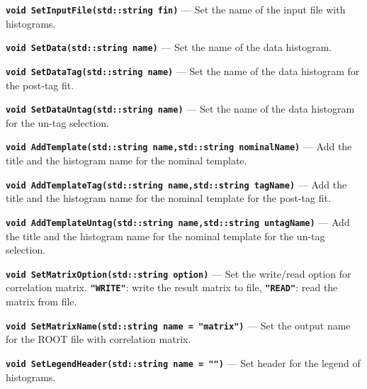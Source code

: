\documentclass[12pt]{article}
\newcommand\verbbf[1]{\textcolor[rgb]{0,0,1}{\texttt{\textbf{#1}}}}
\begin{document}
\noindent \verbbf{void SetInputFile(std::string fin)} --- Set the name
of the input file with histograms.

\vspace{0.3cm}

\noindent \verbbf{void SetData(std::string name)} --- Set the name of
the data histogram.

\vspace{0.3cm}

\noindent \verbbf{void SetDataTag(std::string name)} --- Set the name of
the data histogram for the post-tag fit.

\vspace{0.3cm}

\noindent \verbbf{void SetDataUntag(std::string name)} --- Set the name
of the data histogram for the un-tag selection.

\vspace{0.3cm}

\noindent \verbbf{void AddTemplate(std::string name,std::string nominalName)} ---
Add the title and the histogram name for the nominal template.

\vspace{0.3cm}

\noindent \verbbf{void AddTemplateTag(std::string name,std::string tagName)} ---
Add the title and the histogram name for the nominal template for the
post-tag fit.

\vspace{0.3cm}

\noindent \verbbf{void AddTemplateUntag(std::string name,std::string untagName)} ---
Add the title and the histogram name for the nominal template for the
un-tag selection.

\vspace{0.3cm}

\noindent \verbbf{void SetMatrixOption(std::string option)} ---
Set the write/read option for correlation matrix. \verbbf{"WRITE"}:
write the result matrix to file, \verbbf{"READ"}: read the matrix from
file.

\vspace{0.3cm}

\noindent \verbbf{void SetMatrixName(std::string name = "matrix")} ---
Set the output name for the ROOT file with correlation matrix.

\vspace{0.3cm}

\noindent \verbbf{void SetLegendHeader(std::string name = "")} ---
Set header for the legend of histograms.
\end{document}
